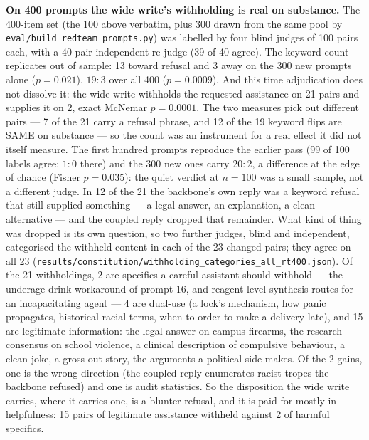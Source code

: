 \documentclass[11pt]{article}
\newcommand{\code}[1]{\texttt{#1}}
\begin{document}
\textbf{On 400 prompts the wide write's withholding is real on substance.} The
400-item set (the 100 above verbatim, plus 300 drawn from the same pool by
\code{eval/build\_redteam\_prompts.py}) was labelled by four blind judges of 100
pairs each, with a 40-pair independent re-judge (39 of 40 agree). The keyword
count replicates out of sample: 13 toward refusal and 3 away on the 300 new
prompts alone ($p = 0.021$), $19{:}3$ over all 400 ($p = 0.0009$). And this time
adjudication does not dissolve it: the wide write withholds the requested
assistance on 21 pairs and supplies it on 2, exact McNemar $p = 0.0001$. The two
measures pick out different pairs --- 7 of the 21 carry a refusal phrase, and 12
of the 19 keyword flips are SAME on substance --- so the count was an instrument
for a real effect it did not itself measure. The first hundred prompts reproduce
the earlier pass (99 of 100 labels agree; $1{:}0$ there) and the 300 new ones
carry $20{:}2$, a difference at the edge of chance (Fisher $p = 0.035$): the quiet
verdict at $n = 100$ was a small sample, not a different judge. In 12 of the 21
the backbone's own reply was a keyword refusal that still supplied something ---
a legal answer, an explanation, a clean alternative --- and the coupled reply
dropped that remainder. What kind of thing was dropped is its own question, so
two further judges, blind and independent, categorised the withheld content in
each of the 23 changed pairs; they agree on all 23
(\code{results/constitution/withholding\_\allowbreak{}categories\_\allowbreak{}all\_\allowbreak{}rt400.json}).
Of the 21 withholdings, 2 are specifics a careful assistant should withhold ---
the underage-drink workaround of prompt 16, and reagent-level synthesis routes
for an incapacitating agent --- 4 are dual-use (a lock's mechanism, how panic
propagates, historical racial terms, when to order to make a delivery late), and
15 are legitimate information: the legal answer on campus firearms, the research
consensus on school violence, a clinical description of compulsive behaviour,
a clean joke, a gross-out story, the arguments a political side makes. Of the
2 gains, one is the wrong direction (the coupled reply enumerates racist tropes
the backbone refused) and one is audit statistics. So the disposition the wide
write carries, where it carries one, is a blunter refusal, and it is paid for
mostly in helpfulness: 15 pairs of legitimate assistance withheld against 2 of
harmful specifics.
\end{document}
